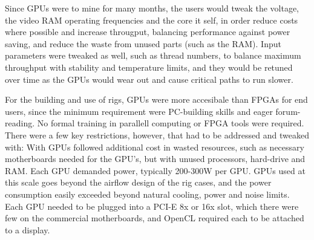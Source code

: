Since GPUs were to mine for many months, the users would tweak the voltage, the video RAM operating frequencies and the core it self, in order reduce costs where possible and increase througput, balancing performance against power saving, and reduce the waste from unused parts (such as the RAM).
Input parameters were tweaked as well, such as thread numbers, to balance maximum throughput with stability and temperature limits, and they would be retuned over time as the GPUs would wear out and cause critical paths to run slower.





For the building and use of rigs, GPUs were more accesibale than FPGAs for end users, since the minimum requirement were PC-building skills and eager forum-reading.
No formal training in parallell computing or FPGA tools were required.
There were a few key restrictions, however, that had to be addressed and tweaked with:
With GPUs followed additional cost in wasted resources, such as necessary motherboards needed for the GPU's, but with unused processors, hard-drive and RAM. 
Each GPU demanded power, typically 200-300W per GPU.
GPUs used at this scale goes beyond the airflow design of the rig cases, and the power consumption easily exceeded beyond natural cooling, power and noise limits.
Each GPU needed to be plugged into a PCI-E 8x or 16x slot, which there were few on the commercial motherboards, and OpenCL required each to be attached to a display. 

